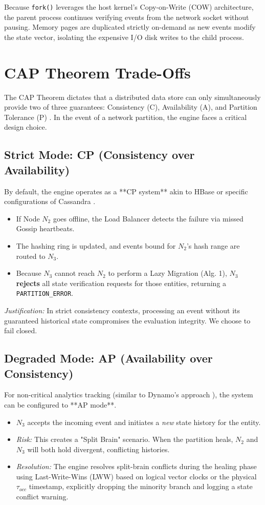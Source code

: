 \documentclass[conference]{IEEEtran}
\begin{document}
Because \texttt{fork()} leverages the host kernel's Copy-on-Write (COW) architecture, the parent process continues verifying events from the network socket without pausing. Memory pages are duplicated strictly on-demand as new events modify the state vector, isolating the expensive I/O disk writes to the child process.

\section{CAP Theorem Trade-Offs}

The CAP Theorem dictates that a distributed data store can only simultaneously provide two of three guarantees: Consistency (C), Availability (A), and Partition Tolerance (P) \cite{b5, b19}. In the event of a network partition, the engine faces a critical design choice.

\subsection{Strict Mode: CP (Consistency over Availability)}
By default, the engine operates as a **CP system** akin to HBase or specific configurations of Cassandra \cite{b7}. 
\begin{itemize}
    \item If Node $N_2$ goes offline, the Load Balancer detects the failure via missed Gossip heartbeats.
    \item The hashing ring is updated, and events bound for $N_2$'s hash range are routed to $N_3$.
    \item Because $N_3$ cannot reach $N_2$ to perform a Lazy Migration (Alg. 1), $N_3$ \textbf{rejects} all state verification requests for those entities, returning a \texttt{PARTITION\_ERROR}.
\end{itemize}
\textit{Justification:} In strict consistency contexts, processing an event without its guaranteed historical state compromises the evaluation integrity. We choose to fail closed.

\subsection{Degraded Mode: AP (Availability over Consistency)}
For non-critical analytics tracking (similar to Dynamo's approach \cite{b6}), the system can be configured to **AP mode**.
\begin{itemize}
    \item $N_3$ accepts the incoming event and initiates a \textit{new} state history for the entity.
    \item \textit{Risk:} This creates a "Split Brain" scenario. When the partition heals, $N_2$ and $N_3$ will both hold divergent, conflicting histories. 
    \item \textit{Resolution:} The engine resolves split-brain conflicts during the healing phase using Last-Write-Wins (LWW) based on logical vector clocks \cite{b23} or the physical $\tau_{occ}$ timestamp, explicitly dropping the minority branch and logging a state conflict warning.
\end{itemize}
\end{document}
